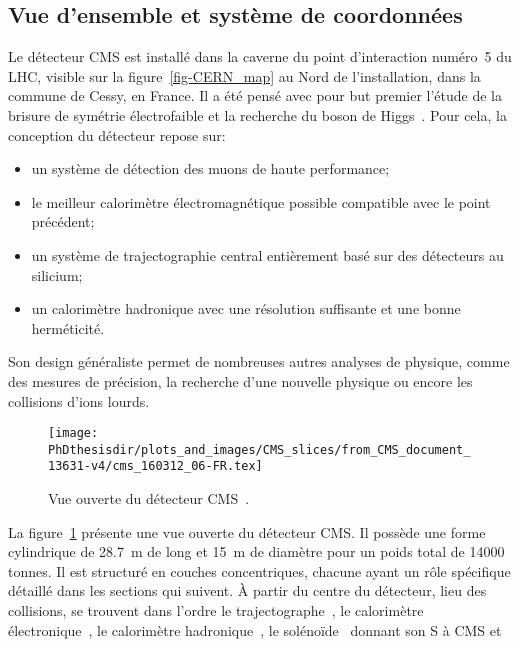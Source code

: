 \subsection{Vue d'ensemble et système de coordonnées}\label{chapter-LHC-section-CMS-subsec-overview_and_coordinates}
Le détecteur CMS est installé dans la caverne du point d'interaction numéro~5 du LHC, visible sur la figure~\ref{fig-CERN_map} au Nord de l'installation, dans la commune de Cessy, en France.
Il a été pensé avec pour but premier l'étude de la brisure de symétrie électrofaible et la recherche du boson de Higgs~\cite{cms_letter_intent}.
Pour cela, la conception du détecteur repose sur:
\begin{itemize}
\item un système de détection des muons de haute performance;
\item le meilleur calorimètre électromagnétique possible compatible avec le point précédent;
\item un système de trajectographie central entièrement basé sur des détecteurs au silicium;
\item un calorimètre hadronique avec une résolution suffisante et une bonne herméticité.
\end{itemize}
Son design généraliste permet de nombreuses autres analyses de physique, comme des mesures de précision, la recherche d'une nouvelle physique ou encore les collisions d'ions lourds.
\begin{figure}[b]
\centering
\texttt{[image: \\PhDthesisdir/plots\_and\_images/CMS\_slices/from\_CMS\_document\_13631-v4/cms\_160312\_06-FR.tex]}
\caption[Vue ouverte du détecteur CMS.]{Vue ouverte du détecteur CMS~\cite{CMS_document_13631-v4}.}
\label{fig-chapter-LHC-section-CMS-subsec-overview_and_coordinates-vue_eclatee_CMS}
\end{figure}
\par La figure~\ref{fig-chapter-LHC-section-CMS-subsec-overview_and_coordinates-vue_eclatee_CMS} présente une vue ouverte du détecteur CMS.
Il possède une forme cylindrique de \SI{28.7}{\meter} de long et \SI{15}{\meter} de diamètre pour un poids total de \num{14000} tonnes.
Il est structuré en couches concentriques, chacune ayant un rôle spécifique détaillé dans les sections qui suivent.
À partir du centre du détecteur, lieu des collisions, se trouvent dans l'ordre
le trajectographe~\cite{CERN-LHCC-98-006},
le calorimètre électronique~\cite{CERN-LHCC-97-033},
le calorimètre hadronique~\cite{CERN-LHCC-97-031},
le solénoïde~\cite{CERN-LHCC-97-010} donnant son \og S \fg{} à CMS et
